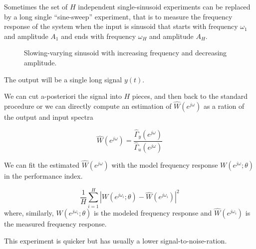\begin{remark}
    Sometimes the set of $H$ independent single-sinusoid experiments can be replaced by a long single ``sine-sweep'' experiment, that is to measure the frequency response of the system when the input is sinusoid that starts with frequency $\omega_1$ and amplitude $A_1$ and ends with frequency $\omega_H$ and amplitude $A_H$. 

    \begin{figure}[H]
        \centering
        \caption*{Slowing-varying sinusoid with increasing frequency and decreasing amplitude.}
    \end{figure}

    The output will be a single long signal $y(t)$.
    
    We can cut a-posteriori the signal into $H$ pieces, and then back to the standard procedure
    or we can directly compute an estimation of $\hat{W}(e^{j\omega})$ as a ration of the output and input spectra %

    \[
        \hat{W}(e^{j\omega}) = \frac{\hat{\Gamma}_y(e^{j\omega})}{\hat{\Gamma}_u(e^{j\omega})}
    \]

    We can fit the estimated $\hat{W}(e^{j\omega})$ with the model frequency response $W(e^{j\omega}; \theta)$ in the performance index.
    
    \[
        \frac{1}{H} \sum_{i=1}^H \left| W(e^{j \omega_i}; \theta) - \hat{W}(e^{j \omega_i}) \right|^2
    \]
    where, similarly, $W(e^{j\omega_i}; \theta)$ is the modeled frequency response and $\hat{W}(e^{j \omega_i})$ is the measured frequency response.
    
    This experiment is quicker but has usually a lower signal-to-noise-ration.
\end{remark}

